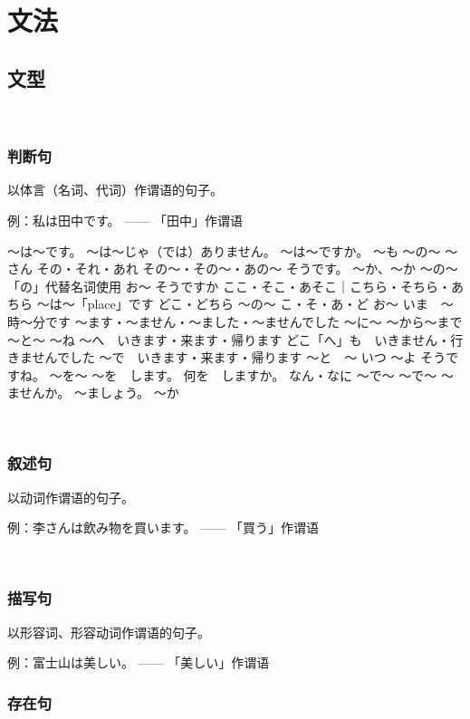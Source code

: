 \chapter{文法}
\newpage

\section{文型}

　　\subsection{判断句}

    以体言（名词、代词）作谓语的句子。
    
    例：私は田中です。
    —— 「田中」作谓语

    ～は～です。
    ～は～じゃ（では）ありません。
    ～は～ですか。
    ～も
    ～の～
    ～さん
    その・それ・あれ
    その～・その～・あの～
    そうです。
    ～か、～か
    ～の～
    「の」代替名词使用
    お～
    そうですか
    ここ・そこ・あそこ｜こちら・そちら・あちら
    ～は～「place」です
    どこ・どちら
    ～の～
    こ・そ・あ・ど
    お～
    いま　～時～分です
    ～ます・～ません・～ました・～ませんでした
    ～に～
    ～から～まで
    ～と～
    ～ね
    ～へ　いきます・来ます・帰ります
    どこ「へ」も　いきません・行きませんでした
    ～で　いきます・来ます・帰ります
    ～と　～
    いつ
    ～よ
    そうですね。
    ～を～
    ～を　します。
    何を　しますか。
    なん・なに
    ～で～
    ～で～
    ～ませんか。
    ～ましょう。
    ～か

　　\subsection{叙述句}

    以动词作谓语的句子。
    
    例：李さんは飲み物を買います。
    —— 「買う」作谓语


　　\subsection{描写句}

    以形容词、形容动词作谓语的句子。
    
    例：富士山は美しい。
    —— 「美しい」作谓语

    \subsection{存在句}
    

